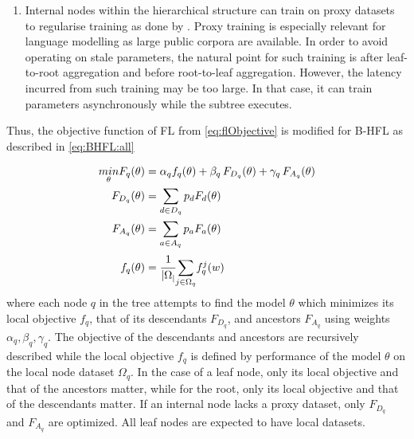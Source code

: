 \begin{singlespace*}
\begin{enumerate}
        \item Internal nodes within the hierarchical structure can train on proxy datasets to regularise training as done by \citet{OneShotFL,FLwithNonIID}. Proxy training is especially relevant for language modelling as large public corpora are available. In order to avoid operating on stale parameters, the natural point for such training is after leaf-to-root aggregation and before root-to-leaf aggregation. However, the latency incurred from such training may be too large. In that case, it can train parameters asynchronously while the subtree executes.
    \end{enumerate}
\end{singlespace*}
Thus, the objective function of FL from \cref{eq:flObjective} is modified for B-HFL as described in \cref{eq:BHFL:all}

\begin{subequations}
    \begin{align}
        \underset{\theta}{min} F_q(\theta) & = \alpha_q f_q(\theta) + \beta_q \, F_{D_q}(\theta) + \gamma_q \, F_{A_q}(\theta) \\
        F_{D_q}(\theta)                    & = \sum_{d \in D_q} p_d F_d(\theta)                                                \\
        F_{A_q}(\theta)                    & = \sum_{a \in A_q} p_a F_a(\theta)                                                \\
        f_q(\theta)                        & = \cfrac{1}{\lvert \Omega_ \rvert} \underset{j \in \Omega_q}{\sum} f_q^j(w)
    \end{align}
    \label{eq:BHFL:all}
\end{subequations}
where each node $q$ in the tree attempts to find the model $\theta$ which minimizes its local objective $f_q$, that of its descendants $F_{D_q}$, and ancestors $F_{A_q}$ using weights $\alpha_q,\beta_q,\gamma_q$. The objective of the descendants and ancestors are recursively described while the local objective $f_q$ is defined by performance of the model $\theta$ on the local node dataset $\Omega_q$. In the case of a leaf node, only its local objective and that of the ancestors matter, while for the root, only its local objective and that of the descendants matter. If an internal node lacks a proxy dataset, only $F_{D_q}$ and $F_{A_q}$ are optimized. All leaf nodes are expected to have local datasets.

